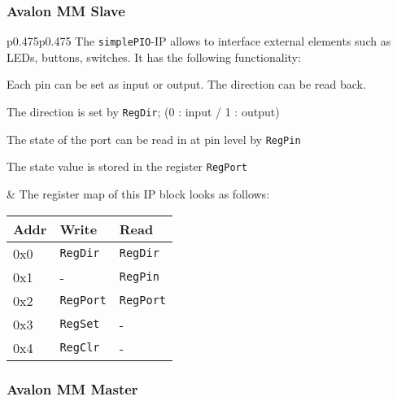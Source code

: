 		\subsubsection{Avalon MM Slave }
			\begin{tabular}{p{0.475\textwidth}p{}}
				The \texttt{simplePIO}-IP allows to interface external elements such as LEDs, buttons, switches. It has the following functionality:
				\begin{compactitem}
					\item Each pin can be set as input or output. The direction can be read back.
					\item The direction is set by \texttt{RegDir}; (0 : input / 1 : output)
					\item The state of the port can be read in at pin level by \texttt{RegPin}
					\item The state value is stored in the register \texttt{RegPort}
				\end{compactitem}
				& 
					The register map of this IP block looks as follows:
					\begin{minipage}{0.5\textwidth}\centering
						\begin{tabular}{|p{0.25\textwidth}|p{}|p{}|}
							\hline
							\textbf{Addr} & \textbf{Write} & \textbf{Read} \\
							\hline
							0x0 & \texttt{RegDir} & \texttt{RegDir} \\ \hline
							0x1 & - & \texttt{RegPin} \\ \hline
							0x2 & \texttt{RegPort} & \texttt{RegPort} \\ \hline
							0x3 & \texttt{RegSet} & - \\ \hline
							0x4 & \texttt{RegClr} & - \\ \hline
						\end{tabular}
					\end{minipage}
			\end{tabular}	
			
			\begin{multicols}{2}		
				
			\end{multicols}			
			
		\subsubsection{Avalon MM Master}
		
		